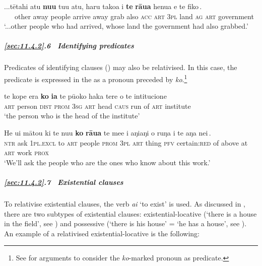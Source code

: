 \ea\label{ex:11.102}
\gll ...tētahi atu \textbf{nu{\ꞌ}u} tu{\ꞌ}u atu, {\ob}haru tako{\ꞌ}a i \textbf{te} \textbf{rāua} henua e te fiko\,{\cb}.\\
~~~other away people arrive away {\db}grab also \textsc{acc} \textsc{art} \textsc{3pl} land \textsc{ag} \textsc{art} government\\

\glt 
‘...other people who had arrived, whose land the government had also grabbed.’ \textstyleExampleref{[R649.055]} 
\z

\subparagraph{\ref{sec:11.4.2}.6~ Identifying predicates} Predicates of identifying clauses () may also be relativised. In this case, the predicate is expressed in the  as a pronoun preceded by \textit{ko}.\footnote{\label{fn:513}See  for arguments to consider the \textit{ko}{}-marked pronoun as predicate.} 

\ea\label{ex:11.103}
\gll te kope era {\ob}\textbf{ko} \textbf{ia} te pū{\ꞌ}oko haka tere o te intitucione\,{\cb} \\
\textsc{art} person \textsc{dist} {\db}\textsc{prom} \textsc{3sg} \textsc{art} head \textsc{caus} run of \textsc{art} institute \\

\glt 
‘the person who is the head of the institute’ \textstyleExampleref{[R647.143]} 
\z

\ea\label{ex:11.104}
\gll He {\ꞌ}ui mātou ki te nu{\ꞌ}u {\ob}\textbf{ko} \textbf{rāua} te me{\ꞌ}e i aŋiaŋi o ruŋa i te aŋa nei\,{\cb}.\\
\textsc{ntr} ask \textsc{1pl.excl} to \textsc{art} people {\db}\textsc{prom} \textsc{3pl} \textsc{art} thing \textsc{pfv} certain:\textsc{red} of above at \textsc{art} work \textsc{prox}\\

\glt 
‘We’ll ask the people who are the ones who know about this work.’ \textstyleExampleref{[R535.193]} 
\z

\subparagraph{\ref{sec:11.4.2}.7~ Existential clauses} To relativise existential clauses, the verb \textit{ai} ‘to exist’ is used. As discussed in , there are two subtypes of existential clauses: existential-locative (‘there is a house in the field’, see ) and possessive (‘there is his house’ = ‘he has a house’, see ). An example of a relativised existential-locative is the following:

